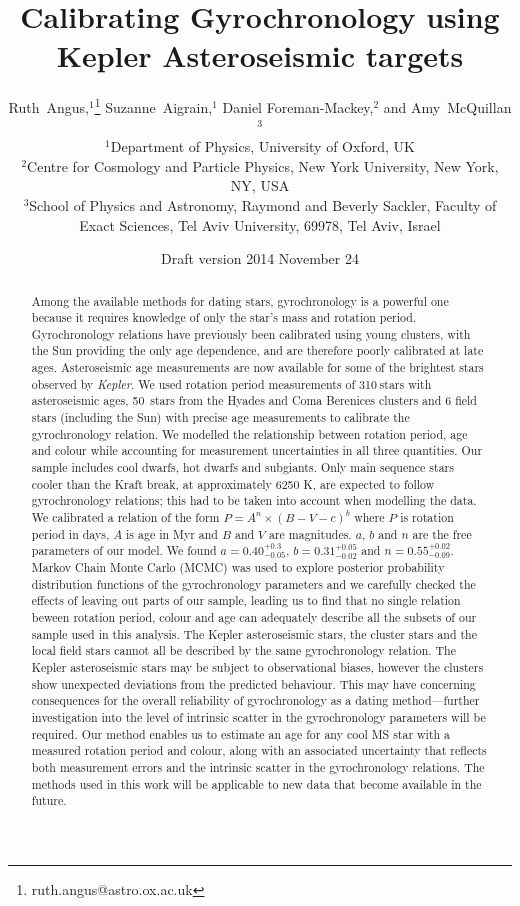 \documentclass[useAMS, usenatbib]{mn2e}
\title{Calibrating Gyrochronology using Kepler Asteroseismic targets}
\author[R.~Angus \emph{et al.}]{%
    Ruth~Angus,$^1$\thanks{ruth.angus@astro.ox.ac.uk}
    Suzanne~Aigrain,$^1$
    Daniel Foreman-Mackey,$^2$ and
    Amy~McQuillan$^3$ \\
    $^1$Department of Physics, University of Oxford, UK \\
    $^2$Centre for Cosmology and Particle Physics, New York University, New York, NY, USA \\
    $^3$School of Physics and Astronomy, Raymond and Beverly Sackler, Faculty of Exact Sciences, Tel Aviv University, 69978, Tel Aviv, Israel}
\newcommand{\nastero}{310}
\newcommand{\nHC}{50~}
\newcommand{\gyroa}{0.40}
\newcommand{\aerrp}{0.3}
\newcommand{\aerrm}{0.05}
\newcommand{\gyron}{0.55}
\newcommand{\nerrp}{0.02}
\newcommand{\nerrm}{0.09}
\newcommand{\gyrob}{0.31}
\newcommand{\berrp}{0.05}
\newcommand{\berrm}{0.02}
\begin{document}
\date{Draft version 2014 November 24}
\maketitle

\begin{abstract}

Among the available methods for dating stars, gyrochronology is a powerful one
because it requires knowledge of only the star's mass and rotation period.
Gyrochronology relations have previously been calibrated using young
clusters, with the Sun providing the only age dependence, and are therefore
poorly calibrated at late ages.
Asteroseismic age measurements are now available for some of the brightest
stars observed by {\it Kepler}.
We used rotation period measurements of \nastero$~$stars with asteroseismic
ages, \nHC stars from the Hyades and Coma Berenices clusters and 6 field stars
(including the Sun) with precise age measurements to calibrate the
gyrochronology relation.
We modelled the relationship between rotation period, age and colour while
accounting for measurement uncertainties in all three quantities.
Our sample includes cool dwarfs, hot dwarfs and subgiants.
Only main sequence stars cooler than the Kraft break, at approximately 6250 K,
are expected to follow gyrochronology relations; this had to be taken into
account when modelling the data.
We calibrated a relation of the form $P=A^n\times(B-V-c)^b$ where $P$ is
rotation period in days, $A$ is age in Myr and $B$ and $V$ are magnitudes.
$a$, $b$ and $n$ are the free parameters of our model.
We found $a = \gyroa^{+\aerrp}_{-\aerrm}$, $b = \gyrob^{+\berrp}_{-\berrm}$ and
$n = \gyron^{+\nerrp}_{-\nerrm}$.
Markov Chain Monte Carlo (MCMC) was used to explore posterior probability
distribution functions of the gyrochronology parameters and we carefully
checked the effects of leaving out parts of our sample, leading us to find
that no single relation beween rotation period, colour and age can adequately
describe all the subsets of our sample used in this analysis.
The Kepler asteroseismic stars, the cluster stars and the local field stars
cannot all be described by the same gyrochronology relation.
The Kepler asteroseismic stars may be subject to observational biases, however
the clusters show unexpected deviations from the predicted behaviour.
This may have concerning consequences for the overall reliability of
gyrochronology as a dating method---further investigation into the level of
intrinsic scatter in the gyrochronology parameters will be required.
Our method enables us to estimate an age for any cool MS star
with a measured rotation period and colour, along with an associated
uncertainty that reflects both measurement errors and the intrinsic scatter in
the gyrochronology relations.
The methods used in this work will be applicable to new data that become
available in the future.

\end{abstract}
\end{document}
